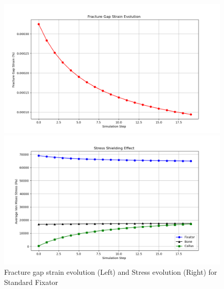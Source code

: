 \documentclass{article}
\begin{document}
\begin{figure}[htbp]
  \centering
  \begin{minipage}{0.45\textwidth}
    \centering
    \includegraphics[width=\textwidth]{../output_advanced/Standard/gap_strain.png}
  \end{minipage}
  \hfill
  \begin{minipage}{0.45\textwidth}
    \centering
    \includegraphics[width=\textwidth]{../output_advanced/Standard/stress_shielding.png}
  \end{minipage}
  \caption{Fracture gap strain evolution (Left) and Stress evolution (Right) for Standard Fixator}
  \label{fig:standard_gap_strain_stress_shielding}
\end{figure}
\end{document}
